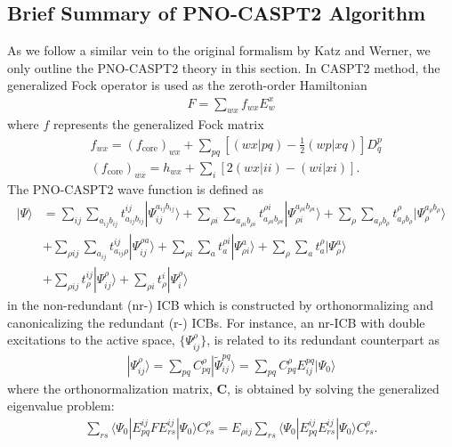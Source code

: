 \documentclass[aip,jcp,amsmath]{revtex4-1}
\begin{document}
\subsection{Brief Summary of PNO-CASPT2 Algorithm}

%
As we follow a similar vein to the original formalism by Katz and Werner,\cite{:/content/aip/journal/jcp/145/12/10.1063/1.4963019,doi:10.1063/1.5097644} we only outline the PNO-CASPT2 theory in this section.
%
In CASPT2 method, the generalized Fock operator is used as the zeroth-order Hamiltonian
%
\begin{align}
  F=\sum_{wx} f_{wx} E^x_w
\end{align}
%
where $f$ represents the generalized Fock matrix
%
\begin{align}
  &f_{wx} = (f_\text{core})_{wx} + \sum_{pq} \left[(wx|pq)-\frac{1}{2}(wp|xq)\right]D^p_q \\
  &(f_\text{core})_{wx} = h_{wx} + \sum_{i} [2(wx|ii)-(wi|xi)]. 
\end{align}
%
The PNO-CASPT2 wave function is defined as
%
\begin{align}
  |\Psi\rangle&=\sum_{ij}\sum_{a_{ij}b_{ij}} t_{a_{ij}b_{ij}}^{ij}|\Psi_{ij}^{a_{ij}b_{ij}}\rangle+\sum_{\rho i}\sum_{a_{\rho i}b_{\rho i}} t_{a_{\rho i}b_{\rho i}}^{\rho i}|\Psi_{{\rho i}}^{a_{\rho i}b_{\rho i}}\rangle+\sum_{\rho}\sum_{a_{\rho}b_{\rho}} t_{a_{\rho}b_{\rho}}^{\rho}|\Psi_{{\rho}}^{a_{\rho}b_{\rho}}\rangle\nonumber \\
  & + \sum_{\rho ij}\sum_{a_{ij}} t_{a_{ij}\rho}^{ij}|\Psi_{ij}^{\rho a}\rangle +\sum_{\rho i}\sum_a t_{a}^{\rho i}|\Psi_{\rho i}^{a}\rangle +\sum_{\rho}\sum_a t_{a}^\rho|\Psi_\rho^a\rangle \nonumber \\
  &+ \sum_{\rho ij} t_{\rho}^{ij}|\Psi_{ij}^\rho\rangle+\sum_{\rho i} t_{\rho}^i|\Psi_{i}^\rho\rangle \label{eq:pno-caspt2}
\end{align}
%
in the non-redundant (nr-) ICB which is constructed by orthonormalizing and canonicalizing the redundant (r-) ICBs.
%
For instance, an nr-ICB with double excitations to the active space, $\{\Psi^{\rho}_{ij}\}$, is related to its redundant counterpart as
%
\begin{align}
  |\Psi_{ij}^{\rho}\rangle=\sum_{pq} C_{pq}^{\rho} |\tilde{\Psi}_{ij}^{pq}\rangle = \sum_{pq} C_{pq}^{\rho} E_{ij}^{pq} |\Psi_0\rangle
\end{align}
%
where the orthonormalization matrix, $\mathbf{C}$, is obtained by solving the generalized eigenvalue problem:
%
\begin{align}
  \sum_{rs}\langle\Psi_0|E_{pq}^{ij}FE_{rs}^{ij}|\Psi_0\rangle C_{rs}^\rho=E_{\rho ij}\sum_{rs}\langle\Psi_0|E_{pq}^{ij}E_{rs}^{ij}|\Psi_0\rangle C_{rs}^\rho. \label{eq:eigen-Vp2}
\end{align}
\end{document}
